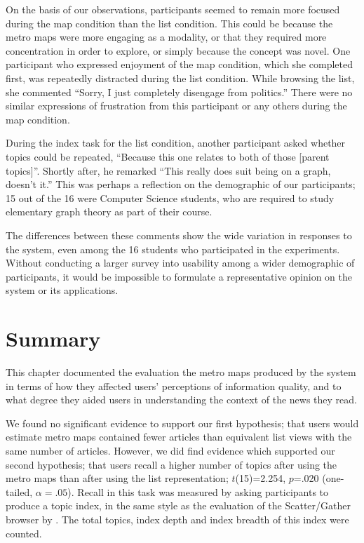 On the basis of our observations, participants seemed to remain more focused during the map condition than the list condition. This could be because the metro maps were more engaging as a modality, or that they required more concentration in order to explore, or simply because the concept was novel. One participant who expressed enjoyment of the map condition, which she completed first, was repeatedly distracted during the list condition. While browsing the list, she commented ``Sorry, I just completely disengage from politics.'' There were no similar expressions of frustration from this participant or any others during the map condition.

During the index task for the list condition, another participant asked whether topics could be repeated, ``Because this one relates to both of those [parent topics]''. Shortly after, he remarked ``This really does suit being on a graph, doesn't it.'' This was perhaps a reflection on the demographic of our participants; 15 out of the 16 were Computer Science students, who are required to study elementary graph theory as part of their course.

The differences between these comments show the wide variation in responses to the system, even among the 16 students who participated in the experiments.
Without conducting a larger survey into usability among a wider demographic of participants, it would be impossible to formulate a representative opinion on the system or its applications.

\section{Summary}

This chapter documented the evaluation the metro maps produced by the system in terms of how they affected users' perceptions of information quality, and to what degree they aided users in understanding the context of the news they read.

We found no significant evidence to support our first hypothesis; that users would estimate metro maps contained fewer articles than equivalent list views with the same number of articles. However, we did find evidence which supported our second hypothesis; that users recall a higher number of topics after using the metro maps than after using the list representation; $t$(15)=2.254, $p$=.020 (one-tailed, $\alpha=.05$). Recall in this task was measured by asking participants to produce a topic index, in the same style as the evaluation of the Scatter/Gather browser by \cite{scattergather}. The total topics, index depth and index breadth of this index were counted.

